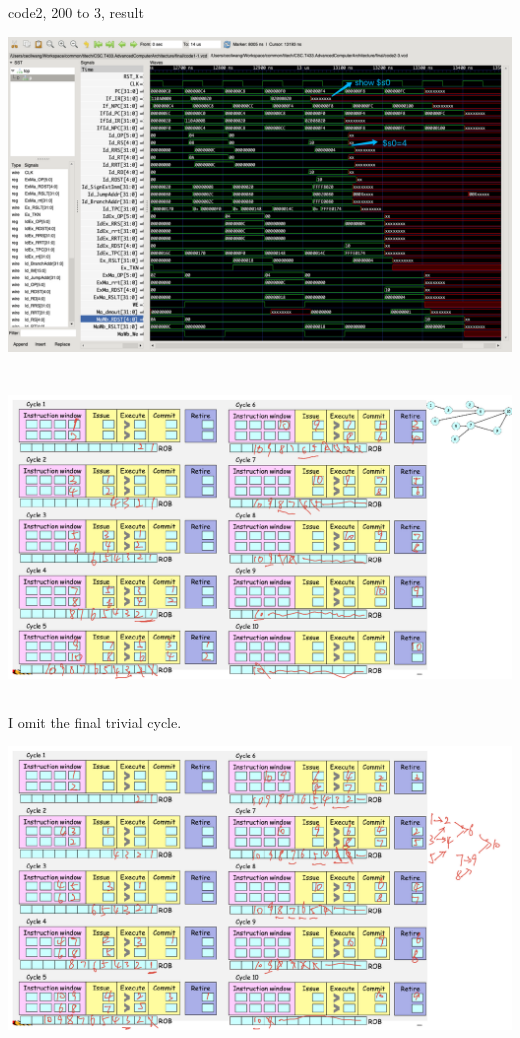 \documentclass{article}
\begin{document}
code2, 200 to 3, result

\includegraphics[width=\textwidth]{code2-3-1.png}

\section{}
\subsection{}
\includegraphics[width=\textwidth]{cycle10-1.png}
\subsection{}
I omit the final trivial cycle.

\includegraphics[width=\textwidth]{cycle10-2.png}
\end{document}
